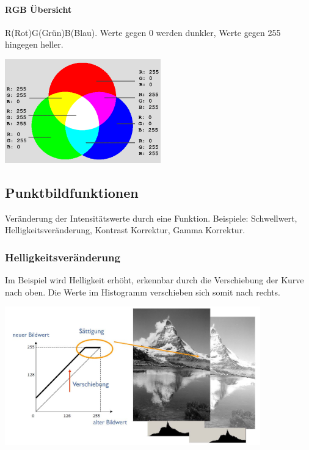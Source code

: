 \paragraph{RGB Übersicht}
R(Rot)G(Grün)B(Blau). Werte gegen 0 werden dunkler, Werte gegen 255 hingegen heller.



\begin{center}
	\includegraphics[height=4.5cm,keepaspectratio]{images/sw01/rgb-farbmodell.png}
\end{center}

\noindent{}




\subsection{Punktbildfunktionen}
Veränderung der Intensitätswerte durch eine Funktion. Beispiele: Schwellwert, Helligkeitsveränderung, Kontrast Korrektur, Gamma Korrektur.

\subsubsection{Helligkeitsveränderung}
Im Beispiel wird Helligkeit erhöht, erkennbar durch die Verschiebung der Kurve nach oben. Die Werte im Histogramm verschieben sich somit nach rechts.
\begin{center}
	\includegraphics[height=6cm,keepaspectratio]{images/sw01/Helligkeitsveraenderung.JPG}
\end{center}

